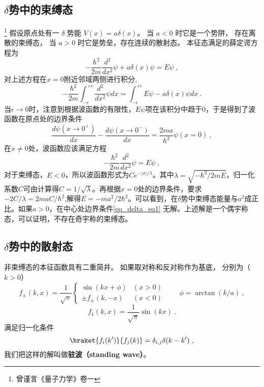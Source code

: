 
\begin{issues}
\issueDraft
\end{issues}

\subsection{$\delta$势中的束缚态}\footnote{曾谨言《量子力学》卷一}
假设原点处有一 $\delta$ 势能 $V(x) = a\delta(x)$。 当 $a < 0$ 时它是一个势阱， 存在离散的束缚态， 当 $a > 0$ 时它是势垒，存在连续的散射态。
本征态满足的薛定谔方程为
\begin{equation}
-\frac{\hbar^2}{2m}\frac{d^2}{dx^2}\psi + a\delta(x)\psi = E\psi ~,
\end{equation}
对上述方程在$x=0$附近邻域两侧进行积分,
\begin{equation}
-\frac{\hbar^2}{2m}\int_{-\epsilon}^{+\epsilon} \frac{d^2}{dx^2}\psi dx = \int_{-\epsilon}^{+\epsilon}E\psi - a\delta(x)\psi dx~.
\end{equation}
当$\epsilon\rightarrow 0$时，注意到根据波函数的有限性，$E\psi$项在该积分中趋于0，于是得到了波函数在原点处的边界条件
\begin{equation}
\frac{d \psi(x\rightarrow 0^+)}{dx}-\frac{d\psi(x \rightarrow 0^-)}{dx} = \frac{2ma}{\hbar^2} \psi(x=0)~,
\label{eq_delta_eq1}
\end{equation}
在$x\neq 0$处，波函数应该满足方程
\begin{equation}
-\frac{\hbar^2}{2m} \frac{d^2}{dx^2}\psi = E\psi~,
\end{equation}
对于束缚态，$E<0$，所以波函数形式为$Ce^{-|x|/\lambda}$。其中$\lambda = \sqrt{-\hbar^2/2mE}$，归一化系数$C$可由计算得$C=1/\sqrt{\lambda}$。再根据$x=0$处的边界条件，要求$-2C/\lambda = 2maC/\hbar^2$,解得$E = -ma^2/2\hbar^2$。可以看到，在$\delta$势中束缚态能量与$a^2$成正比。如果$a>0$，在中心处边界条件\autoref{eq_delta_eq1} 无解。上述解是一个偶宇称态，可以证明，不存在奇宇称的束缚态。

\subsection{$\delta$势中的散射态}

非束缚态的本征函数具有二重简并。 如果取对称和反对称作为基底， 分别为（$k > 0$）
\begin{equation}
f_\pm(k, x) = \frac{1}{\sqrt{\pi}}
\begin{cases}
\sin(kx + \phi) & (x > 0)\\
\pm f_\pm(k, -x) & (x < 0)
\end{cases}
\qquad  \phi = \arctan(k/a)~,
\end{equation}
\begin{equation}
f_1(k, x) = \frac{1}{\sqrt{\pi}}\sin(kx)~.
\end{equation}
满足归一化条件
\begin{equation}\label{eq_Dsc1D_4}
\braket{f_i(k')}{f_j(k)} = \delta_{i,j} \delta(k - k')~,
\end{equation}
我们把这样的解叫做\textbf{驻波（standing wave）}。

